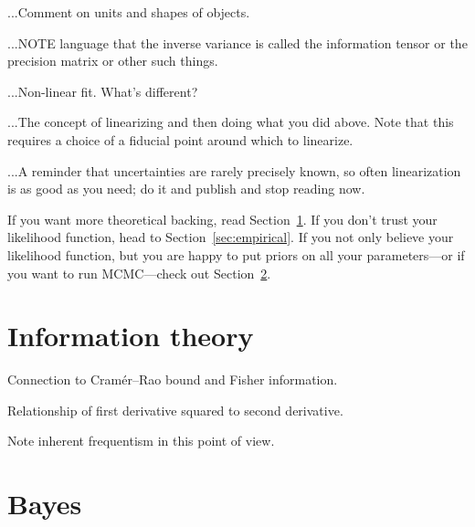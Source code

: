 \documentclass[10pt]{article}
\newcommand{\sectionname}{Section}
\begin{document}
...Comment on units and shapes of objects.

...NOTE language that the inverse variance is called the information tensor or the precision matrix or other such things.

...Non-linear fit. What's different?

...The concept of linearizing and then doing what you did above. Note that this
requires a choice of a fiducial point around which to linearize.

...A reminder that uncertainties are rarely precisely known, so often linearization
is as good as you need; do it and publish and stop reading now.

If you want more theoretical backing, read \sectionname~\ref{sec:info}. If you
don't trust your likelihood function, head to \sectionname~\ref{sec:empirical}.
If you not only believe your likelihood function, but you are happy to put priors
on all your parameters---or if you want to run MCMC---check
out \sectionname~\ref{sec:bayes}.

\section{Information theory}\label{sec:info}

Connection to Cram\'er--Rao bound and Fisher information.

Relationship of first derivative squared to second derivative.

Note inherent frequentism in this point of view.

\section{Bayes}\label{sec:bayes}
\end{document}
